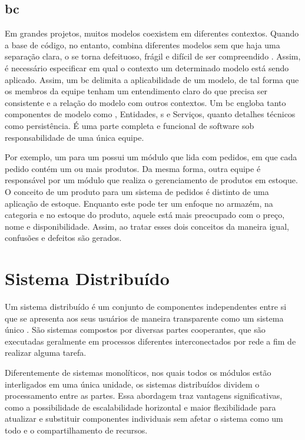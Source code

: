 \subsection{\acrfull{bc}}
\label{section:bounded_context}
Em grandes projetos, muitos modelos coexistem em diferentes contextos. Quando a base de código, no entanto, combina diferentes modelos sem que haja uma separação clara, o  se torna defeituoso, frágil e difícil de ser compreendido \cite{evans2004ddd}. Assim, é necessário especificar em qual o contexto um determinado modelo está sendo aplicado.  Assim, um \acrshort{bc} delimita a aplicabilidade de um modelo, de tal forma que os membros da equipe tenham um entendimento claro do que precisa ser consistente e a relação do modelo com outros contextos. Um \acrshort{bc} engloba tanto componentes de modelo como , Entidades, s e Serviços, quanto detalhes técnicos como persistência. É uma parte completa e funcional de software sob responsabilidade de uma única equipe.

Por exemplo, um  para um  possui um módulo que lida com pedidos, em que cada pedido contém um ou mais produtos. Da mesma forma, outra equipe é responsável por um módulo que realiza o gerenciamento de produtos em estoque. O conceito de um produto para um sistema de pedidos é distinto de uma aplicação de estoque. Enquanto este pode ter um enfoque no armazém, na categoria e no estoque do produto, aquele está mais preocupado com o preço, nome e disponibilidade. Assim, ao tratar esses dois conceitos da maneira igual, confusões e defeitos são gerados.


\section{Sistema Distribuído} 
\label{section:sistemas_distribuidos}

Um sistema distribuído é um conjunto de componentes independentes entre si que se apresenta aos seus usuários de maneira transparente como um sistema único \cite{tanenbaum2010sistemas}. São sistemas compostos por diversas partes cooperantes, que são executadas geralmente em processos diferentes interconectados por rede a fim de realizar alguma tarefa. 

Diferentemente de sistemas monolíticos, nos quais todos os módulos estão interligados em uma única unidade, os sistemas distribuídos dividem o processamento entre as partes. Essa abordagem traz vantagens significativas, como a possibilidade de escalabilidade horizontal e maior flexibilidade para atualizar e substituir componentes individuais sem afetar o sistema como um todo e o compartilhamento de recursos.

